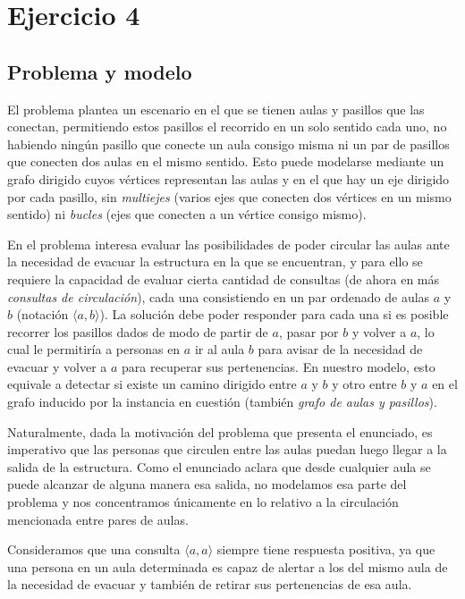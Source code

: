 \section{Ejercicio 4}

\subsection{Problema y modelo}

El problema plantea un escenario en el que se tienen aulas y pasillos que las conectan, permitiendo estos pasillos el recorrido en un solo sentido cada uno, no habiendo ningún pasillo que conecte un aula consigo misma ni un par de pasillos que conecten dos aulas en el mismo sentido. Esto puede modelarse mediante un grafo dirigido cuyos vértices representan las aulas y en el que hay un eje dirigido por cada pasillo, sin \textit{multiejes} (varios ejes que conecten dos vértices en un mismo sentido) ni \textit{bucles} (ejes que conecten a un vértice consigo mismo).

En el problema interesa evaluar las posibilidades de poder circular las aulas ante la necesidad de evacuar la estructura en la que se encuentran, y para ello se requiere la capacidad de evaluar cierta cantidad de consultas (de ahora en más \textit{consultas de circulación}), cada una consistiendo en un par ordenado de aulas $a$ y $b$ (notación $\langle a,b \rangle$). La solución debe poder responder para cada una si es posible recorrer los pasillos dados de modo de partir de $a$, pasar por $b$ y volver a $a$, lo cual le permitiría a personas en $a$ ir al aula $b$ para avisar de la necesidad de evacuar y volver a $a$ para recuperar sus pertenencias. En nuestro modelo, esto equivale a detectar si existe un camino dirigido entre $a$ y $b$ y otro entre $b$ y $a$ en el grafo inducido por la instancia en cuestión (también \textit{grafo de aulas y pasillos}).

Naturalmente, dada la motivación del problema que presenta el enunciado, es imperativo que las personas que circulen entre las aulas puedan luego llegar a la salida de la estructura. Como el enunciado aclara que desde cualquier aula se puede alcanzar de alguna manera esa salida, no modelamos esa parte del problema y nos concentramos únicamente en lo relativo a la circulación mencionada entre pares de aulas.

Consideramos que una consulta $\langle a,a \rangle$ siempre tiene respuesta positiva, ya que una persona en un aula determinada es capaz de alertar a los del mismo aula de la necesidad de evacuar y también de retirar sus pertenencias de esa aula.

